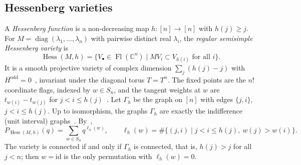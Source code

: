 \documentclass[11pt,a4paper]{article}
\numberwithin{equation}{section}
\theoremstyle{plain}
\theoremstyle{definition}
\theoremstyle{remark}
\newcommand{\C}{\mathbb{C}}
\DeclareMathOperator{\Fl}{Fl}
\DeclareMathOperator{\Hess}{Hess}
\DeclareMathOperator{\diag}{diag}
\begin{document}
\subsection{Hessenberg varieties}
A \emph{Hessenberg function} is a non-decreasing map $h\colon[n]\to[n]$ with $h(j)\geqslant j$. For $M=\diag(\lambda_1,\dots,\lambda_n)$ with pairwise distinct real $\lambda_i$, the \emph{regular semisimple Hessenberg variety} is
\[
\Hess(M,h)=\{V_\bullet\in\Fl(\C^n)\mid MV_i\subset V_{h(i)}\text{ for all }i\}.
\]
It is a smooth projective variety of complex dimension $\sum_j(h(j)-j)$ with $H^{\mathrm{odd}}=0$~\cite{DPS92,AH20}, invariant under the diagonal torus $T=T^n$. The fixed points are the $n!$ coordinate flags, indexed by $w\in S_n$, and the tangent weights at $w$ are $t_{w(i)}-t_{w(j)}$ for $j<i\leqslant h(j)$~\cite{DPS92,Tym08}. Let $\Gamma_h$ be the graph on $[n]$ with edges $\{j,i\}$, $j<i\leqslant h(j)$. Up to isomorphism, the graphs $\Gamma_h$ are exactly the indifference (unit interval) graphs~\cite{AB21}. By~\cite{DPS92},
\begin{equation}\label{eq:dps}
P_{\Hess(M,h)}(q)=\sum_{w\in S_n}q^{\ell_h(w)},\qquad \ell_h(w)=\#\{(j,i)\mid j<i\leqslant h(j),\ w(j)>w(i)\}.
\end{equation}
The variety is connected if and only if $\Gamma_h$ is connected, that is, $h(j)>j$ for all $j<n$; then $w=\mathrm{id}$ is the only permutation with $\ell_h(w)=0$.
\end{document}
